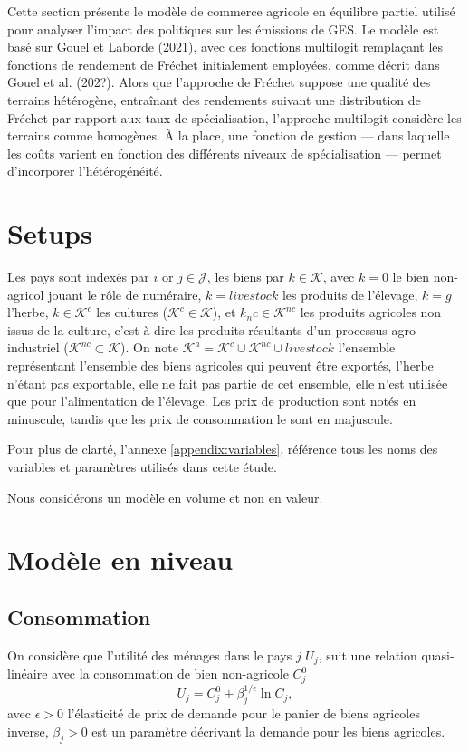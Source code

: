 Cette section présente le modèle de commerce agricole en équilibre partiel utilisé pour analyser l’impact des politiques sur les émissions de GES. Le modèle est basé sur Gouel et Laborde (2021), avec des fonctions multilogit remplaçant les fonctions de rendement de Fréchet initialement employées, comme décrit dans Gouel et al. (202?). Alors que l’approche de Fréchet suppose une qualité des terrains hétérogène, entraînant des rendements suivant une distribution de Fréchet par rapport aux taux de spécialisation, l’approche multilogit considère les terrains comme homogènes. À la place, une fonction de gestion — dans laquelle les coûts varient en fonction des différents niveaux de spécialisation — permet d’incorporer l’hétérogénéité.


\section{Setups}

Les pays sont indexés par $i$ or $j \in \mathcal{J}$, les biens par $k \in \mathcal{K}$, avec $k=0$ le bien non-agricol jouant le rôle de numéraire, $k = livestock$ les produits de l’élevage, $k = g$ l’herbe, $k \in \mathcal{K}^c$ les cultures ($\mathcal{K}^c \in \mathcal{K}$), et $k_nc \in \mathcal{K}^{nc}$ les produits agricoles non issus de la culture, c’est-à-dire les produits résultants d’un processus agro-industriel ($\mathcal{K}^{nc} \subset \mathcal{K}$). On note $\mathcal{K}^a = \mathcal{K}^c \cup \mathcal{K}^{nc} \cup livestock$ l’ensemble représentant l’ensemble des biens agricoles qui peuvent être exportés, l’herbe n’étant pas exportable, elle ne fait pas partie de cet ensemble, elle n’est utilisée que pour l’alimentation de l’élevage. Les prix de production sont notés en minuscule, tandis que les prix de consommation le sont en majuscule.

Pour plus de clarté, l’annexe \ref{appendix:variables}, référence tous les noms des variables et paramètres utilisés dans cette étude.

Nous considérons un modèle en volume et non en valeur.

\section{Modèle en niveau}
\subsection{Consommation}

On considère que l’utilité des ménages dans le pays $j$ $U_j$, suit une relation quasi-linéaire avec la consommation de bien non-agricole $C_j^0$
\begin{equation}\label{eq_u}
	U_j = C_j^0 + \beta_j^{1/\epsilon} \ln C_j,
\end{equation}
avec $\epsilon > 0$ l’élasticité de prix de demande pour le panier de biens agricoles inverse, $\beta_j > 0$ est un paramètre décrivant la demande pour les biens agricoles.

